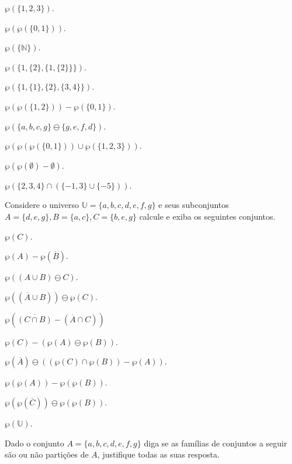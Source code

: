 \begin{exerList}
	\item $\wp(\{1, 2, 3\})$.
	\item $\wp(\wp(\{0,1\}))$.
	\item $\wp(\{\mathbb{N}\})$.
	\item $\wp(\{1, \{2\}, \{1, \{2\}\}\})$.
	\item $\wp(\{1, \{1\}, \{2\}, \{3, 4\}\})$.
	\item $\wp(\wp(\{1, 2\})) - \wp(\{0, 1\})$.
	\item $\wp(\{a, b, c, g\} \ominus \{g, e, f, d\})$.
	\item $\wp(\wp(\wp(\{0,1\})) \cup \wp(\{1, 2, 3\}))$.
	\item $\wp(\wp(\emptyset) - \emptyset)$.
	\item $\wp(\{2, 3, 4\} \cap (\{-1, 3\} \cup \{-5\}))$.
\end{exerList}

\begin{problem}\label{prob:Conjuntos15}
	Considere o universo $\mathbb{U} = \{a, b, c, d, e, f, g\}$ e seus subconjuntos $A = \{d, e, g\}, B = \{a, c\}, C =\{b, e, g\}$ calcule e exiba os seguintes conjuntos.
\end{problem}

\begin{exerList}
	\item $\wp(C)$.
	\item $\wp(A) - \wp(\overline{B})$.
	\item $\wp((A \cup B) \ominus C)$.
	\item $\wp((\overline{A} \cup B)) \ominus \wp(C)$.
	\item $\wp(\overline{(C \cap B)} - (\overline{A} \cap C))$
	\item $\wp(C) - (\wp(A) \ominus \wp(B))$.
	\item $\wp(\overline{A}) \ominus ((\wp(C) \cap \wp(B))  -  \wp(A))$.
	\item $\wp(\wp(A)) - \wp(\wp(B))$.
	\item $\wp(\wp(\overline{C})) \ominus \wp(\wp(B))$.
	\item $\wp(\mathbb{U})$.
\end{exerList}

\begin{problem}\label{prob:Conjuntos16}
	Dado o conjunto $A = \{a, b, c, d, e, f, g\}$ diga se as famílias de conjuntos a seguir são ou não partições de $A$, justifique todas as suas resposta.
\end{problem}

